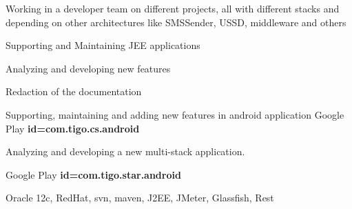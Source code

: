 \begin{experiences}
{                    Working in a developer team on different projects, all with different stacks and depending on other architectures like SMSSender, USSD, middleware and others}
                {

                        \begin{itemize}
                            \item Supporting and Maintaining JEE applications
                            \item Analyzing and developing new features
                            \item Redaction of the documentation
                            \item Supporting, maintaining and adding new features in android application \tiny{Google Play \textbf{id=com.tigo.cs.android}}
                            \normalsize{\item Analyzing and developing a new multi-stack application.} \tiny{Google Play \textbf{id=com.tigo.star.android}}
                      \end{itemize}

                }
                {Oracle 12c, RedHat, svn, maven, J2EE, JMeter, Glassfish, Rest}
  \emptySeparator


\end{experiences}
